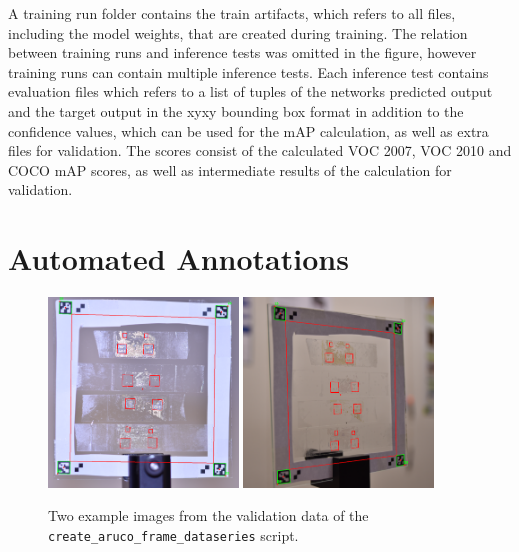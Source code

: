 \documentclass[10pt]{book}
\begin{document}
A training run folder contains the train artifacts, which refers to all files, including the model weights, that are created during training. The relation between training runs and inference tests was omitted in the figure, however training runs can contain multiple inference tests. Each inference test contains evaluation files which refers to a list of tuples of the networks predicted output and the target output in the xyxy bounding box format in addition to the confidence values, which can be used for the \ac{mAP} calculation, as well as extra files for validation. The scores consist of the calculated VOC 2007, VOC 2010 and COCO \ac{mAP} scores, as well as intermediate results of the calculation for validation.

\section{Automated Annotations}

\begin{figure}
  \centering
     {\includegraphics[width=0.45\textwidth]{image/af_markings_1}}
     {\includegraphics[width=0.45\textwidth]{image/af_markings_2}}
  \caption{Two example images from the validation data of the \texttt{create\_aruco\_frame\_dataseries} script.}
  \label{fig:af_markings}
\end{figure}
\end{document}

